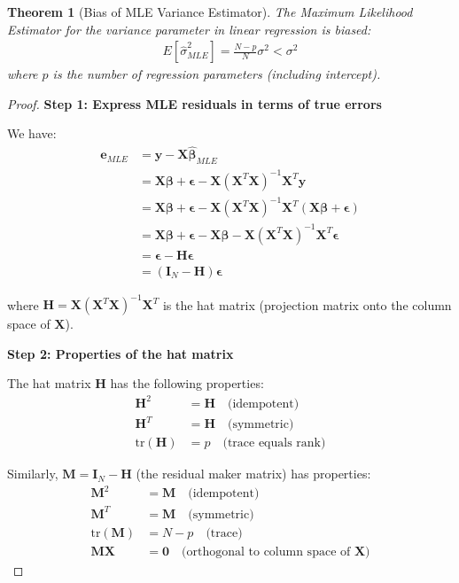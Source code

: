 \documentclass{article}
\newtheorem{theorem}{Theorem}
\begin{document}
\begin{theorem}[Bias of MLE Variance Estimator]
The Maximum Likelihood Estimator for the variance parameter in linear regression is biased:
\begin{align}
E[\hat{\sigma}^2_{MLE}] = \frac{N-p}{N}\sigma^2 < \sigma^2
\end{align}
where $p$ is the number of regression parameters (including intercept).
\end{theorem}

\begin{proof}
\textbf{Step 1: Express MLE residuals in terms of true errors}

We have:
\begin{align}
\mathbf{e}_{MLE} &= \mathbf{y} - \mathbf{X}\hat{\boldsymbol{\beta}}_{MLE} \nonumber\\
&= \mathbf{X}\boldsymbol{\beta} + \boldsymbol{\epsilon} - \mathbf{X}(\mathbf{X}^T\mathbf{X})^{-1}\mathbf{X}^T\mathbf{y} \nonumber\\
&= \mathbf{X}\boldsymbol{\beta} + \boldsymbol{\epsilon} - \mathbf{X}(\mathbf{X}^T\mathbf{X})^{-1}\mathbf{X}^T(\mathbf{X}\boldsymbol{\beta} + \boldsymbol{\epsilon}) \nonumber\\
&= \mathbf{X}\boldsymbol{\beta} + \boldsymbol{\epsilon} - \mathbf{X}\boldsymbol{\beta} - \mathbf{X}(\mathbf{X}^T\mathbf{X})^{-1}\mathbf{X}^T\boldsymbol{\epsilon} \nonumber\\
&= \boldsymbol{\epsilon} - \mathbf{H}\boldsymbol{\epsilon} \nonumber\\
&= (\mathbf{I}_N - \mathbf{H})\boldsymbol{\epsilon} \label{eq:residuals_projection}
\end{align}

where $\mathbf{H} = \mathbf{X}(\mathbf{X}^T\mathbf{X})^{-1}\mathbf{X}^T$ is the hat matrix (projection matrix onto the column space of $\mathbf{X}$).

\textbf{Step 2: Properties of the hat matrix}

The hat matrix $\mathbf{H}$ has the following properties:
\begin{align}
\mathbf{H}^2 &= \mathbf{H} \quad \text{(idempotent)} \label{eq:hat_idempotent}\\
\mathbf{H}^T &= \mathbf{H} \quad \text{(symmetric)} \label{eq:hat_symmetric}\\
\text{tr}(\mathbf{H}) &= p \quad \text{(trace equals rank)} \label{eq:hat_trace}
\end{align}

Similarly, $\mathbf{M} = \mathbf{I}_N - \mathbf{H}$ (the residual maker matrix) has properties:
\begin{align}
\mathbf{M}^2 &= \mathbf{M} \quad \text{(idempotent)} \label{eq:residual_idempotent}\\
\mathbf{M}^T &= \mathbf{M} \quad \text{(symmetric)} \label{eq:residual_symmetric}\\
\text{tr}(\mathbf{M}) &= N - p \quad \text{(trace)} \label{eq:residual_trace}\\
\mathbf{MX} &= \mathbf{0} \quad \text{(orthogonal to column space of } \mathbf{X}\text{)} \label{eq:residual_orthogonal}
\end{align}


\end{proof}
\end{document}

